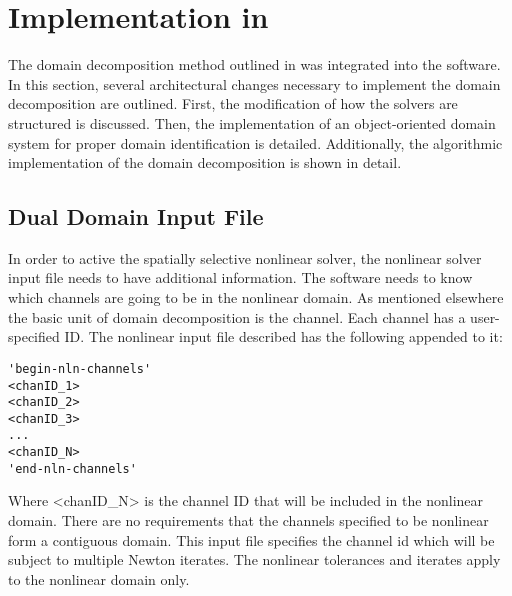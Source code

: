 \section{Implementation in \cobra{}}
\label{sec:dd_algo}

The domain decomposition method outlined in  was integrated into the \cobra{} software.
In this section, several architectural changes necessary to implement the domain decomposition are outlined.
First, the modification of how the solvers are structured is discussed.
Then, the implementation of an object-oriented domain system for proper domain identification is detailed.
Additionally, the algorithmic implementation of the domain decomposition is shown in detail.

\subsection{Dual Domain Input File}
\label{subsect:domDecompInputFile}

In order to active the spatially selective nonlinear solver, the nonlinear solver input file needs to have additional information.
The software needs to know which channels are going to be in the nonlinear domain.
As mentioned elsewhere  the basic unit of domain decomposition is the channel.
Each channel has a user-specified ID.
The nonlinear input file described  has the following appended to it:
{
\singlespace
\begin{verbatim}
'begin-nln-channels'
<chanID_1>
<chanID_2>
<chanID_3>
...
<chanID_N>
'end-nln-channels'
\end{verbatim}
}
Where <chanID\_N> is the channel ID that will be included in the nonlinear domain.
There are no requirements that the channels specified to be nonlinear form a contiguous domain.
This input file specifies the channel id which will be subject to multiple Newton iterates.
The nonlinear tolerances and iterates apply to the nonlinear domain only.

